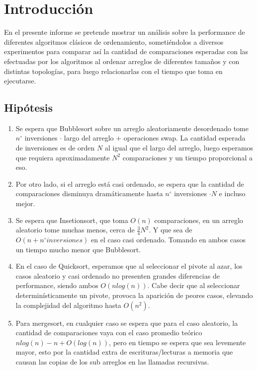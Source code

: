 \documentclass[12pt,letterpaper, margin = 3cm]{article}
\begin{document}

\tableofcontents

\newpage
\section{Introducción}

En el presente informe se pretende mostrar un análisis sobre la performance de diferentes algoritmos clásicos de ordenamiento, sometiéndolos a diversos experimentos para comparar así la cantidad de comparaciones esperadas con las efectuadas por los algoritmos al ordenar arreglos de diferentes tamaños y con distintas topologías, para luego relacionarlas con el tiempo que toma en ejecutarse.

\subsection{Hipótesis}
\begin{enumerate}
\item Se espera que Bubblesort sobre un arreglo aleatoriamente desordenado tome $n^\circ$ inversiones $\cdot$ largo del arreglo $+$ operaciones swap. La cantidad esperada de inversiones es de orden $N$ al igual que el largo del arreglo, luego esperamos que requiera aproximadamente $N^2$ comparaciones y un tiempo proporcional a eso.
\item Por otro lado, si el arreglo está casi ordenado, se espera que la cantidad de comparaciones disminuya dramáticamente hasta $n^\circ$ inversiones $\cdot N$ e incluso mejor.
\item Se espera que Insetionsort, que toma $O(n)$ comparaciones, en un arreglo aleatorio tome muchas menos, cerca de $\frac{3}{4}N^2$. Y que sea de $O(n + n^\circ inversiones)$ en el caso casi ordenado. Tomando en ambos casos un tiempo mucho menor que Bubblesort.
\item En el caso de Quicksort, esperamos que al seleccionar el pivote al azar, los casos aleatorio y casi ordenado no presenten grandes diferencias de performance, siendo ambos $O(nlog(n))$. Cabe decir que al seleccionar determinísticamente un pivote, provoca la aparición de peores casos, elevando la complejidad del algoritmo hasta $O(n^2)$.
\item Para mergesort, en cualquier caso se espera que para el caso aleatorio, la cantidad de comparaciones vaya con el caso promedio teórico $nlog(n) - n + O(log(n))$, pero en tiempo se espera que sea levemente mayor, esto por la cantidad extra de escrituras/lecturas a memoria que causan las copias de los sub arreglos en las llamadas recursivas.
\end{enumerate}
\end{document}
